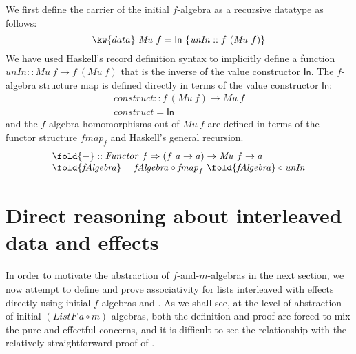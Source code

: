 We first define the carrier of the initial $f$-algebra as a recursive
datatype as follows:
\begin{displaymath}
  \kw{data}~\mathit{Mu}~f = \mathsf{In}~\{ \mathit{unIn} :: f~(\mathit{Mu}~f) \}
\end{displaymath}
We have used Haskell's record definition syntax to implicitly define a
function $\mathit{unIn} :: \mathit{Mu}~f \to f~(\mathit{Mu}~f)$ that
is the inverse of the value constructor $\mathsf{In}$.  The
$f$-algebra structure map is defined directly in terms of the value
constructor $\mathsf{In}$:
\begin{displaymath}
  \begin{array}{l}
    \mathit{construct} :: f~(\mathit{Mu}~f) \to \mathit{Mu}~f \\
    \mathit{construct} = \mathsf{In}
  \end{array}
\end{displaymath}
and the $f$-algebra homomorphisms out of $\mathit{Mu}~f$ are defined
in terms of the functor structure $\mathit{fmap}_f$ and Haskell's
general recursion.
\begin{displaymath}
  \begin{array}{l}
    \fold{-} :: \mathit{Functor}~f \Rightarrow (f~a \to a) \to \mathit{Mu}~f \to a \\
    \fold{\mathit{fAlgebra}} = \mathit{fAlgebra} \circ \mathit{fmap}_f~\fold{\mathit{fAlgebra}} \circ \mathit{unIn}
  \end{array}
\end{displaymath}

\section{Direct reasoning about interleaved data and effects}
\label{sec:direct-eappend}

In order to motivate the abstraction of $f$-and-$m$-algebras in the
next section, we now attempt to define and prove associativity for
lists interleaved with effects directly using initial $f$-algebras and
. As we shall see, at the level of
abstraction of initial $(\mathit{ListF}~a \circ m)$-algebras, both the
definition and proof are forced to mix the pure and effectful
concerns, and it is difficult to see the relationship with the
relatively straightforward proof of .

